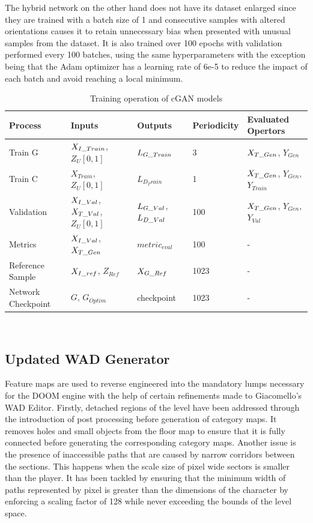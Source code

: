 \documentclass{Configuration_Files/PoliMi3i_thesis}
\begin{document}
The hybrid network on the other hand does not have its dataset enlarged since they 
are trained with a batch size of 1 and consecutive samples with altered orientations 
causes it to retain unnecessary bias when presented with unusual samples from the 
dataset. It is also trained over 100 epochs with validation performed every 100 
batches, using the same hyperparameters with the exception being that the Adam 
optimizer has a learning rate of 6e-5 to reduce the impact of each batch and avoid
reaching a local minimum.
\begin{table}[H]
\centering 
\begin{tabular}{ |C{2.5cm}|C{2.5cm}|C{2.5cm}|C{2.5cm}|C{2.5cm}|}
\hline
\textbf{Process} & \textbf{Inputs} & \textbf{Outputs} & \textbf{Periodicity} & \textbf{Evaluated Opertors} \\
\hline
Train G & $X_{I\char`_Train}$, $Z_{U}[0,1]$ & $L_{G\char`_Train}$ & 3 & $X_{T\char`_Gen}$, $Y_{Gen}$\\
\hline
Train C & $X_{Train}$, $Z_{U}[0,1]$ & $L_{D_Train}$ & 1 & $X_{T\char`_Gen}$, $Y_{Gen}$, $Y_{Train}$\\
\hline
Validation & $X_{I\char`_Val}$, $X_{T\char`_Val}$, $Z_{U}[0,1]$ & $L_{G\char`_Val}$, $L_{D\char`_Val}$ & 100 & $X_{T\char`_Gen}$, $Y_{Gen}$, $Y_{Val}$\\
\hline
Metrics & $X_{I\char`_Val}$, $X_{T\char`_Gen}$ & $metric_{eval}$ & 100 & -\\
\hline
Reference Sample & $X_{I\char`_ref}$, $Z_{Ref}$ & $X_{G\char`_Ref}$ & 1023 & -\\
\hline
Network Checkpoint & $G$, $G_{Optim}$ & checkpoint & 1023 & -\\
\hline
\end{tabular}
\\[10pt]
\caption{Training operation of cGAN models}
\label{table:cgantrain}
\end{table}

\subsection{Updated WAD Generator}
Feature maps are used to reverse engineered into the mandatory lumps necessary for
the DOOM engine with the help of certain refinements made to Giacomello’s WAD 
Editor. Firstly, detached regions of the level have been addressed through the 
introduction of post processing before generation of category maps. It removes holes 
and small objects from the floor map to ensure that it is fully connected before 
generating the corresponding category maps. Another issue is the presence of inaccessible 
paths that are caused by narrow corridors between the sections. This happens when the scale 
size of pixel wide sectors is smaller than the player. It has been tackled by ensuring that 
the minimum width of paths represented by pixel is greater than the dimensions of the character 
by enforcing a scaling factor of 128 while never exceeding the bounds of the level space.
\end{document}
